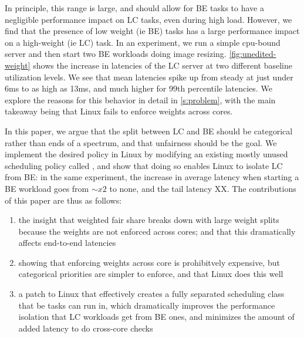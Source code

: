 In principle, this range is large, and should allow for BE tasks to have a
negligible performance impact on LC tasks, even during high load. However, we
find that the presence of low weight (ie BE) tasks has a large performance
impact on a high-weight (ie LC) task. In an experiment, we run a simple
cpu-bound server and then start two BE workloads doing image resizing.
\autoref{fig:unedited-weight} shows the increase in latencies of the LC server
at two different baseline utilization levels. We see that mean latencies spike
up from steady at just under 6ms to as high as 13ms, and much higher for 99th
percentile latencies. We explore the reasons for this behavior in detail in
\autoref{s:problem}, with the main takeaway being that Linux fails to enforce
weights across cores.

In this paper, we argue that the split between LC and BE should be categorical
rather than ends of a spectrum, and that unfairness should be the goal. We
implement the desired policy in Linux by modifying an existing mostly unused
scheduling policy called \schedidle{}, and show that doing so enables Linux to
isolate LC from BE: in the same experiment, the increase in average latency when
starting a BE workload goes from $\sim x 2$ to none, and the tail latency XX.
The contributions of this paper are thus as follows: 
\begin{enumerate}
    \item the insight that weighted fair share breaks down with large weight
    splits because the weights are not enforced across cores; and that this
    dramatically affects end-to-end latencies
    \item showing that enforcing weights across core is prohibitvely expensive,
    but categorical priorities are simpler to enforce, and that Linux does this
    well
    \item a patch to Linux that effectively creates a fully separated scheduling
    class that be tasks can run in, which dramatically improves the performance
    isolation that LC workloads get from BE ones, and minimizes the amount of
    added latency to do cross-core checks
\end{enumerate}
